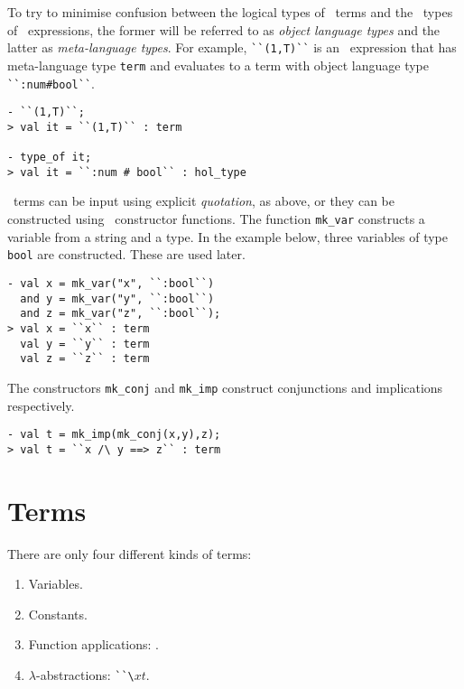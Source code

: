 To try to minimise confusion between the logical types of \HOL\ terms and
the \ML\ types of \ML\ expressions, the former will be referred to as {\it object
language types\/} and the latter as {\it meta-language types\/}.  For example,
{\small\verb|``(1,T)``|} is an \ML\ expression that has meta-language type
{\small\verb|term|} and evaluates to a term with object language type
{\small\verb|``:num#bool``|}.


\begin{session}
\begin{verbatim}
- ``(1,T)``;
> val it = ``(1,T)`` : term

- type_of it;
> val it = ``:num # bool`` : hol_type
\end{verbatim}
\end{session}

\HOL\ terms can be input using explicit {\it quotation\/}, as above, or
they can be constructed using \ML\ constructor functions. The function
{\small\verb|mk_var|} constructs a variable from a string and a type.  In
the example below, three variables of type {\small\verb|bool|} are
constructed.  These are used later.

\begin{session}
\begin{verbatim}
- val x = mk_var("x", ``:bool``)
  and y = mk_var("y", ``:bool``)
  and z = mk_var("z", ``:bool``);
> val x = ``x`` : term
  val y = ``y`` : term
  val z = ``z`` : term
\end{verbatim}
\end{session}

The constructors {\small\verb|mk_conj|} and {\small\verb|mk_imp|} construct
conjunctions and implications respectively.

\begin{session}
\begin{verbatim}
- val t = mk_imp(mk_conj(x,y),z);
> val t = ``x /\ y ==> z`` : term
\end{verbatim}
\end{session}

\section{Terms}

There are only four different kinds of terms:
\begin{enumerate}
\item Variables.
\item Constants.
\item Function applications: .
\item $\lambda$-abstractions: {\small\verb|``\|}$x$$t$.
\end{enumerate}

